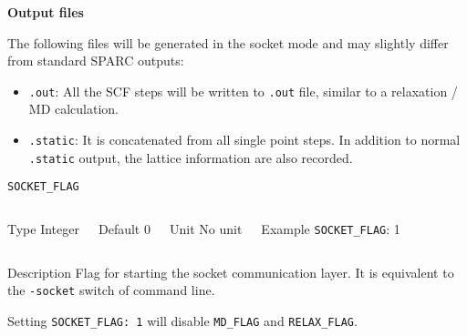 \begin{frame}[allowframebreaks]{\textbf{Output files}} \label{SOCKET_OUTPUT}
  
  The following files will be generated in the socket mode and may slightly
  differ from standard SPARC outputs:
  \begin{itemize}
  \item \texttt{.out}: All the SCF steps will be written to  \texttt{.out} file, similar to a relaxation / MD calculation.
  \item \texttt{.static}: It is concatenated from all single point
    steps.  In addition to normal \texttt{.static} output, the lattice
    information are also recorded.
 \end{itemize}

\end{frame}

\begin{frame}[allowframebreaks]{\texttt{SOCKET\_FLAG}} \label{SOCKET_FLAG}
\vspace*{-12pt}
\begin{columns}
\begin{block}{Type}
Integer
\end{block}

\begin{block}{Default}
0
\end{block}

\begin{block}{Unit}
No unit
\end{block}

\begin{block}{Example}
\texttt{SOCKET\_FLAG}: 1
\end{block}
\end{columns}

\begin{block}{Description}
  Flag for starting the socket communication layer. It is equivalent to the \texttt{-socket} switch of command line.

  Setting \texttt{SOCKET\_FLAG: 1} will disable \texttt{MD\_FLAG} and \texttt{RELAX\_FLAG}.
  
\end{block}


\end{frame}

